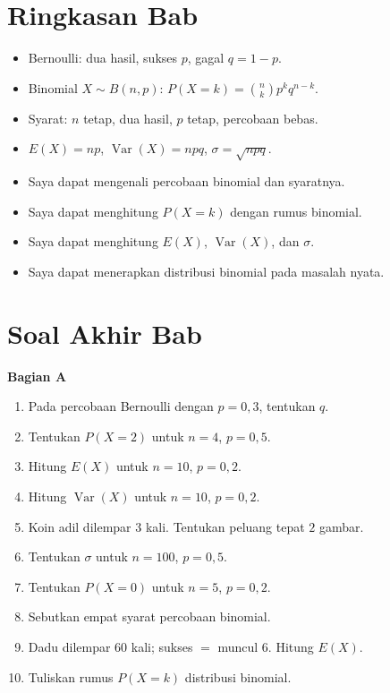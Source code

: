\documentclass[11pt,a4paper]{report}
\theoremstyle{gaya}
\newcommand{\bagiansoal}[2]{%
  \par\medskip\noindent
  {\large\bfseries\color{biru}Bagian #1}\par\smallskip
  \addcontentsline{toc}{subsection}{Bagian #1}}
\newcommand{\cek}{\ding{113}\ } %
\begin{document}
\section*{Ringkasan Bab}
\begin{itemize}[leftmargin=*,topsep=2pt]
  \item Bernoulli: dua hasil, sukses $p$, gagal $q=1-p$.
  \item Binomial $X\sim B(n,p)$: $P(X=k)=\binom nk p^k q^{n-k}$.
  \item Syarat: $n$ tetap, dua hasil, $p$ tetap, percobaan bebas.
  \item $E(X)=np$, $\operatorname{Var}(X)=npq$, $\sigma=\sqrt{npq}$.
\end{itemize}

\begin{refleksi}
\begin{itemize}[leftmargin=*,topsep=2pt]
  \item[\cek] Saya dapat mengenali percobaan binomial dan syaratnya.
  \item[\cek] Saya dapat menghitung $P(X=k)$ dengan rumus binomial.
  \item[\cek] Saya dapat menghitung $E(X)$, $\operatorname{Var}(X)$, dan $\sigma$.
  \item[\cek] Saya dapat menerapkan distribusi binomial pada masalah nyata.
\end{itemize}
\end{refleksi}

\section*{Soal Akhir Bab \thechapter}

\bagiansoal{A}{(Fundamental --- setara SNBT Dasar)}
\begin{enumerate}[leftmargin=*]
  \item Pada percobaan Bernoulli dengan $p=0{,}3$, tentukan $q$.
  \item Tentukan $P(X=2)$ untuk $n=4$, $p=0{,}5$.
  \item Hitung $E(X)$ untuk $n=10$, $p=0{,}2$.
  \item Hitung $\operatorname{Var}(X)$ untuk $n=10$, $p=0{,}2$.
  \item Koin adil dilempar $3$ kali. Tentukan peluang tepat $2$ gambar.
  \item Tentukan $\sigma$ untuk $n=100$, $p=0{,}5$.
  \item Tentukan $P(X=0)$ untuk $n=5$, $p=0{,}2$.
  \item Sebutkan empat syarat percobaan binomial.
  \item Dadu dilempar $60$ kali; sukses $=$ muncul $6$. Hitung $E(X)$.
  \item Tuliskan rumus $P(X=k)$ distribusi binomial.
\end{enumerate}
\end{document}
